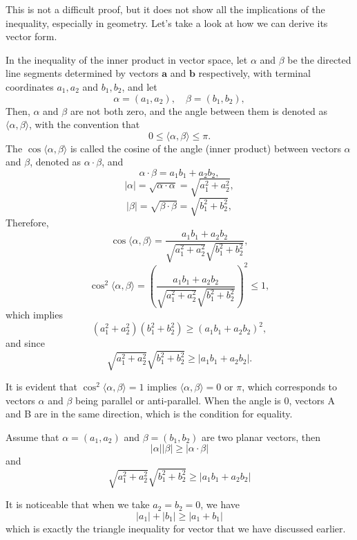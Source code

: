 This is not a difficult proof, but it does not show all the implications of the inequality, especially in
geometry. Let's take a look at how we can derive its vector form.

In the inequality of the inner product in vector space, let \(\alpha\) and \(\beta\) be the directed line segments determined by vectors \(\mathbf{a}\) and \(\mathbf{b}\) respectively, with terminal coordinates \(a_1, a_2\) and \(b_1, b_2\), and let
\[
\alpha = (a_1, a_2), \quad \beta = (b_1, b_2),
\]
Then, \(\alpha\) and \(\beta\) are not both zero, and the angle between them is denoted as \(\langle \alpha, \beta \rangle\), with the convention that
\[
0 \leq \langle \alpha, \beta \rangle \leq \pi.
\]
The \(\cos \langle \alpha, \beta \rangle\) is called the cosine of the angle (inner product) between vectors \(\alpha\) and \(\beta\), denoted as \(\alpha \cdot \beta\), and
\[
\alpha \cdot \beta = a_1b_1 + a_2b_2,
\]
\[
|\alpha| = \sqrt{\alpha \cdot \alpha} = \sqrt{a_1^2 + a_2^2},
\]
\[
|\beta| = \sqrt{\beta \cdot \beta} = \sqrt{b_1^2 + b_2^2},
\]
Therefore,
\[
\cos\langle \alpha, \beta \rangle = \frac{a_1b_1 + a_2b_2}{\sqrt{a_1^2 + a_2^2} \sqrt{b_1^2 + b_2^2}},
\]
\[
\cos^2\langle \alpha, \beta \rangle = \left(\frac{a_1b_1 + a_2b_2}{\sqrt{a_1^2 + a_2^2} \sqrt{b_1^2 + b_2^2}}\right)^2 \leq 1,
\]
which implies
\[
(a_1^2 + a_2^2)(b_1^2 + b_2^2) \geq (a_1b_1 + a_2b_2)^2,
\]
and since
\begin{equation}\label{CSvec}
    \sqrt{a_1^2 + a_2^2} \sqrt{b_1^2 + b_2^2} \geq |a_1b_1 + a_2b_2|.
\end{equation}

It is evident that \(\cos^2\langle \alpha, \beta \rangle = 1\) implies \(\langle \alpha, \beta \rangle = 0\) or \(\pi\), which corresponds to vectors \(\alpha\) and \(\beta\) being parallel or anti-parallel. When the angle is 0, vectors A and B are in the same direction, which is the condition for equality.

\begin{theorem}
    \label{CSvector}
    Assume that $\alpha = (a_1, a_2)$ and $\beta = (b_1, b_2)$ are two planar vectors, then
    $$|\alpha||\beta|\geq |\alpha \cdot \beta|$$
    and$$\sqrt{a_1^2 + a_2^2} \sqrt{b_1^2 + b_2^2} \geq |a_1b_1 + a_2b_2|$$
\end{theorem}   

It is noticeable that when we take $a_2=b_2=0$, we have
$$|a_1|+|b_1|\geq|a_1+b_1|$$
which is exactly the triangle inequality for vector that we have discussed earlier.


